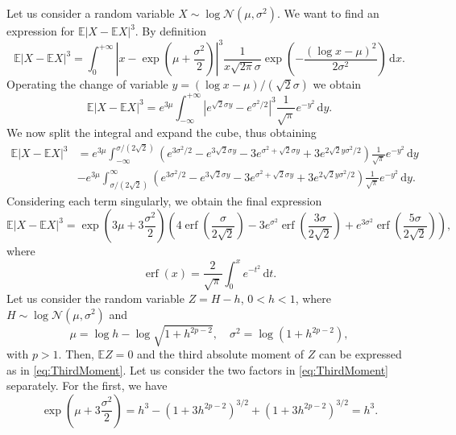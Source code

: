 \documentclass{scrartcl}
\theoremstyle{definition}
\theoremstyle{plain}
\newcommand{\erf}{\operatorname{erf}}
\newcommand{\E}{\mathbb{E}}
\newcommand{\dd}{\mathrm{d}}
\begin{document}
	
	Let us consider a random variable $X \sim \log\mathcal{N}(\mu, \sigma^2)$. We want to find an expression for $\E|X - \E X|^3$. By definition
	\begin{equation*}
		\E|X - \E X|^3 = \int_{0}^{+\infty}\left|x-\exp\left(\mu+\frac{\sigma^2}{2}\right)\right|^3 \frac{1}{x\sqrt{2\pi}\sigma}\exp\left(-\frac{(\log x-\mu)^2}{2\sigma^2}\right) \, \dd x.
	\end{equation*}
	Operating the change of variable $y = (\log x - \mu) / (\sqrt 2 \sigma)$ we obtain
	\begin{equation*}
		\E|X - \E X|^3 = e^{3\mu}\int_{-\infty}^{+\infty}\left|e^{\sqrt 2 \sigma y}-e^{\sigma^2/2}\right|^3 \frac{1}{\sqrt \pi}e^{-y^2} \, \dd y.
	\end{equation*}
	We now split the integral and expand the cube, thus obtaining
	\begin{align*}
		\E|X - \E X|^3 &= e^{3\mu}\int_{-\infty}^{\sigma/(2\sqrt 2)}\left(e^{3\sigma^2/2} - e^{3\sqrt 2 \sigma y} -3 e^{\sigma^2 + \sqrt 2 \sigma y} + 3e^{2\sqrt 2 y \sigma^2/2}\right) \frac{1}{\sqrt \pi}e^{-y^2} \, \dd y\\
		&- e^{3\mu} \int_{\sigma/(2\sqrt 2)}^{\infty}\left(e^{3\sigma^2/2} - e^{3\sqrt 2 \sigma y} -3 e^{\sigma^2 + \sqrt 2 \sigma y} + 3e^{2\sqrt 2 y \sigma^2/2}\right) \frac{1}{\sqrt \pi}e^{-y^2} \, \dd y.
	\end{align*}
	Considering each term singularly, we obtain the final expression
	\begin{equation}\label{eq:ThirdMoment}
		\E|X - \E X|^3 =  \exp\left(3\mu + 3\frac{\sigma^2}{2}\right)\left(4\erf\left(\frac{\sigma}{2\sqrt{2}}\right)
		-3e^{\sigma^2}\erf\left(\frac{3\sigma}{2\sqrt{2}}\right)
		+e^{3\sigma^2}\erf\left(\frac{5\sigma}{2\sqrt{2}}\right)\right),
	\end{equation}
	where 
	\begin{equation*}
		\erf(x) = \frac{2}{\sqrt\pi}\int_{0}^{x} e^{-t^2} \, \dd t.
	\end{equation*}
	Let us consider the random variable $Z = H - h$, $0 < h < 1$, where $H \sim \log\mathcal{N}(\mu, \sigma^2)$ and
	\begin{equation*}
		\mu = \log h - \log\sqrt{1 + h^{2p - 2}}, \quad \sigma^2 = \log(1 + h^{2p-2}),
	\end{equation*}
	with $p > 1$.
	Then, $\E Z = 0$ and the third absolute moment of $Z$ can be expressed as in \eqref{eq:ThirdMoment}. Let us consider the two factors in \eqref{eq:ThirdMoment} separately. For the first, we have
	\begin{equation}\label{eq:ThirdMoment_FirstTerm}
		\exp\left(\mu + 3\frac{\sigma^2}{2}\right) = h^3 - \left(1 + 3h^{2p-2}\right)^{3/2} + \left(1 + 3h^{2p-2}\right)^{3/2} = h^3.
	\end{equation}
\end{document}
